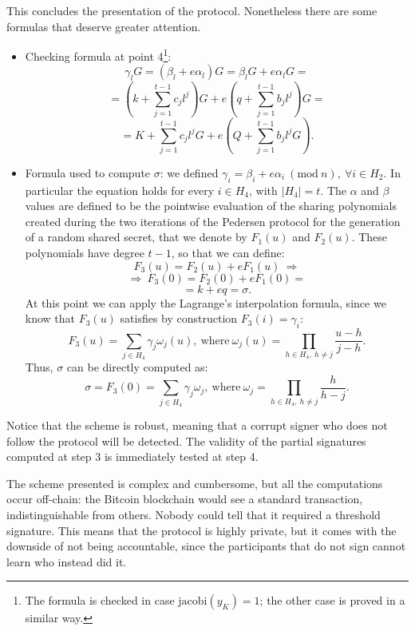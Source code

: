 This concludes the presentation of the protocol. Nonetheless there are some formulas that deserve greater attention.
\begin{itemize}
	\item Checking formula at point 4\footnote{The formula is checked in case $\text{jacobi}(y_K) = 1$; the other case is proved in a similar way.}: 
	$$\gamma_lG = (\beta_l + e\alpha_l)G = \beta_lG + e\alpha_lG = $$
	$$= \left(k + \sum_{j = 1}^{t - 1}c_jl^j\right)G + e\left(q + \sum_{j = 1}^{t - 1}b_jl^j\right)G =$$
	$$= K + \sum_{j = 1}^{t - 1}c_jl^jG + e\left(Q + \sum_{j = 1}^{t - 1}b_jl^jG\right).$$
	\item Formula used to compute $\sigma$: we defined $\gamma_i = \beta_i + e\alpha_i \ (\text{mod} \ n), \ \forall i \in H_2$. In particular the equation holds for every $i \in H_4$, with $|H_4| = t$. The $\alpha$ and $\beta$ values are defined to be the pointwise evaluation of the sharing polynomials created during the two iterations of the Pedersen protocol for the generation of a random shared secret, that we denote by $F_1(u)$ and $F_2(u)$. These polynomials have degree $t - 1$, so that we can define:
	$$F_3(u) = F_2(u) + eF_1(u) \ \Longrightarrow $$
	$$\Longrightarrow \ F_3(0) = F_2(0) + eF_1(0) = $$
	$$= k + eq = \sigma.$$
	At this point we can apply the Lagrange's interpolation formula, since we know that $F_3(u)$ satisfies by construction $F_3(i) = \gamma_i$:
	$$F_3(u) = \sum_{j \in H_4}\gamma_j\omega_j(u), \ \text{where} \ \omega_j(u) = \prod_{h \in H_4, \ h \neq j}\frac{u - h}{j -h}.$$
	Thus, $\sigma$ can be directly computed as:
	$$\sigma = F_3(0) = \sum_{j \in H_4}\gamma_j\omega_j, \ \text{where} \ \omega_j = \prod_{h \in H_4, \ h \neq j}\frac{h}{h - j}.$$
\end{itemize}
Notice that the scheme is robust, meaning that a corrupt signer who does not follow the protocol will be detected. The validity of the partial signatures computed at step 3 is immediately tested at step 4.

\bigskip

\bigskip
\noindent
The scheme presented is complex and cumbersome, but all the computations occur off-chain: the Bitcoin blockchain would see a standard transaction, indistinguishable from others. Nobody could tell that it required a threshold signature. This means that the protocol is highly private, but it comes with the downside of not being accountable, since the participants that do not sign cannot learn who instead did it.

\bigskip

